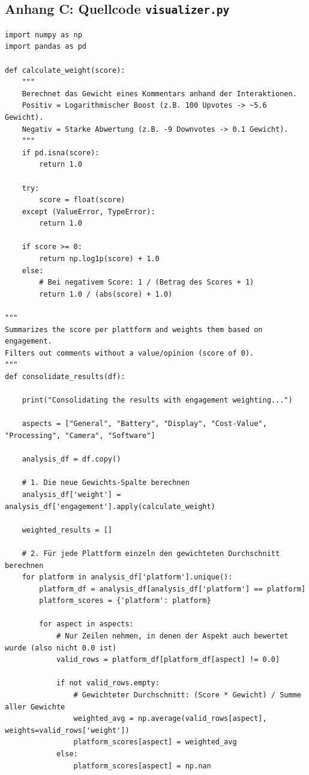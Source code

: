 \documentclass[12pt]{article}
\begin{document}
\newpage
\subsection*{Anhang C: Quellcode \texttt{visualizer.py}}
\label{app:visualizer}
\begin{lstlisting}
import numpy as np
import pandas as pd

def calculate_weight(score):
    """
    Berechnet das Gewicht eines Kommentars anhand der Interaktionen.
    Positiv = Logarithmischer Boost (z.B. 100 Upvotes -> ~5.6 Gewicht).
    Negativ = Starke Abwertung (z.B. -9 Downvotes -> 0.1 Gewicht).
    """
    if pd.isna(score):
        return 1.0
        
    try:
        score = float(score)
    except (ValueError, TypeError):
        return 1.0
        
    if score >= 0:
        return np.log1p(score) + 1.0
    else:
        # Bei negativem Score: 1 / (Betrag des Scores + 1)
        return 1.0 / (abs(score) + 1.0)

"""
Summarizes the score per plattform and weights them based on engagement.
Filters out comments without a value/opinion (score of 0).
"""
def consolidate_results(df):

    print("Consolidating the results with engagement weighting...")
    
    aspects = ["General", "Battery", "Display", "Cost-Value", "Processing", "Camera", "Software"]
    
    analysis_df = df.copy()
    
    # 1. Die neue Gewichts-Spalte berechnen
    analysis_df['weight'] = analysis_df['engagement'].apply(calculate_weight)
    
    weighted_results = []
    
    # 2. Für jede Plattform einzeln den gewichteten Durchschnitt berechnen
    for platform in analysis_df['platform'].unique():
        platform_df = analysis_df[analysis_df['platform'] == platform]
        platform_scores = {'platform': platform}
        
        for aspect in aspects:
            # Nur Zeilen nehmen, in denen der Aspekt auch bewertet wurde (also nicht 0.0 ist)
            valid_rows = platform_df[platform_df[aspect] != 0.0]
            
            if not valid_rows.empty:
                # Gewichteter Durchschnitt: (Score * Gewicht) / Summe aller Gewichte
                weighted_avg = np.average(valid_rows[aspect], weights=valid_rows['weight'])
                platform_scores[aspect] = weighted_avg
            else:
                platform_scores[aspect] = np.nan
                

\end{lstlisting}
\end{document}
